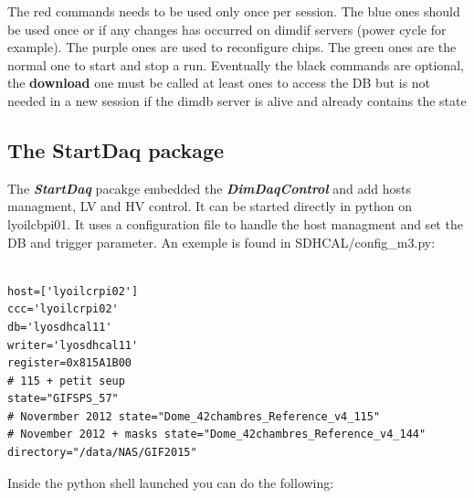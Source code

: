 \documentclass[english]{article}
\begin{document}
The red commands needs to be used only once per session. The blue ones should be used once or if any changes has occurred on dimdif servers (power cycle for example). The purple ones are used to reconfigure chips. The green ones are the normal one to start and stop a run. Eventually the black commands are optional, the {\bf download} one must be called at least ones to access the DB but is not needed in a new session if the dimdb server is alive and already contains the state 

\subsection{ The StartDaq package }
The {\bf \sl StartDaq} pacakge embedded the { \bf \sl DimDaqControl }  and add hosts managment, LV and HV control. It can be started directly in python on lyoilcbpi01. It uses a configuration file to handle the host managment and set the DB and trigger parameter. An exemple is found in SDHCAL/config\_m3.py:

\begin{verbatim}

host=['lyoilcrpi02']
ccc='lyoilcrpi02'
db='lyosdhcal11'
writer='lyosdhcal11'
register=0x815A1B00
# 115 + petit seup
state="GIFSPS_57"
# Novermber 2012 state="Dome_42chambres_Reference_v4_115"
# November 2012 + masks state="Dome_42chambres_Reference_v4_144"
directory="/data/NAS/GIF2015"

\end{verbatim}


Inside the python shell launched you can do the following:
\end{document}
